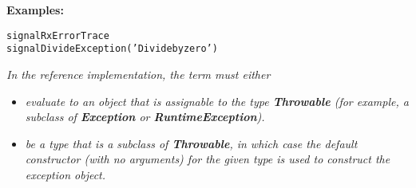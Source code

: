 \textbf{Examples:}
\begin{alltt}
signal RxErrorTrace
signal DivideException('Divide by zero')
\end{alltt}

\emph{In the reference implementation, the \emph{term} must
either}
\begin{itemize}
\item 
\emph{evaluate to an object that is assignable to the
type \textbf{Throwable} (for example, a subclass
of \textbf{Exception} or \textbf{RuntimeException}).}
\item 
\emph{be a type that is a subclass of \textbf{Throwable}, in which case
the default constructor (with no arguments) for the given type is used
to construct the exception object.}
\end{itemize}
